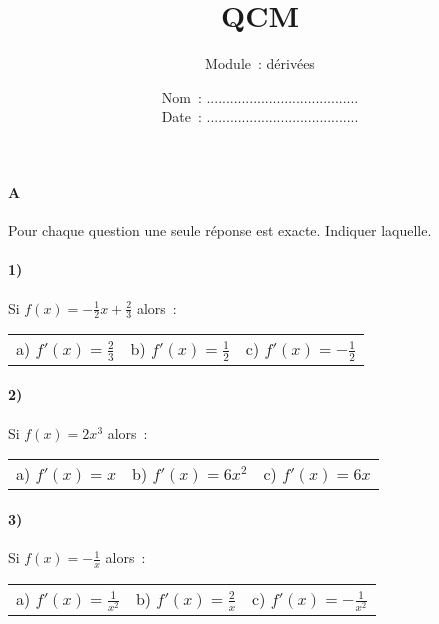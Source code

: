 \documentclass[a4paper]{article}
\begin{document}
  \title{QCM}
  \author{Module~: dérivées}
  \date{
    Nom~: .......................................\\
    \vspace{0.2cm}
    Date~: .......................................}
  \maketitle
  
  \paragraph{A}
  Pour chaque question une seule réponse est exacte. Indiquer laquelle.
  \paragraph{1)}
  Si $f(x) = - \frac{1}{2} x + \frac{2}{3}$ alors~:
  \begin{center}
    \begin{tabular}{p{3cm}p{3cm}p{3cm}}
      a) $f'(x) = \frac{2}{3}$ & b) $f'(x) = \frac{1}{2}$ & c) $f'(x) = - \frac{1}{2}$
    \end{tabular}
  \end{center}

  \paragraph{2)}
  Si $f(x) = 2 x^3$ alors~:
  \begin{center}
    \begin{tabular}{p{3cm}p{3cm}p{3cm}}
      a) $f'(x) = x$ & b) $f'(x) = 6 x^2$ & c) $f'(x) = 6x$
    \end{tabular}
  \end{center}

  \paragraph{3)}
  Si $f(x) = - \frac{1}{x}$ alors~:
  \begin{center}
    \begin{tabular}{p{3cm}p{3cm}p{3cm}}
      a) $f'(x) = \frac{1}{x^2}$ & b) $f'(x) = \frac{2}{x}$ & c) $f'(x) = - \frac{1}{x^2}$
    \end{tabular}
  \end{center}
\end{document}
